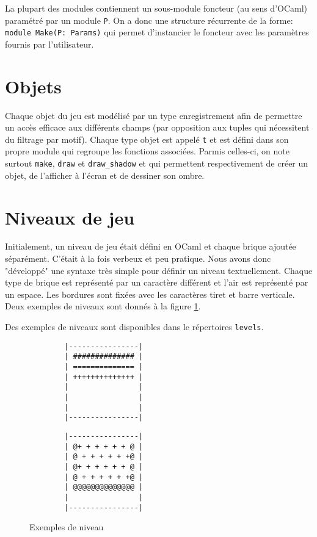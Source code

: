 \documentclass[french]{template}
\begin{document}
La plupart des modules contiennent un sous-module foncteur (au sens d'OCaml) paramétré par un module \texttt{P}. On a donc une structure récurrente de la forme: \texttt{module Make(P: Params)} qui permet d'instancier le foncteur avec les paramètres fournis par l'utilisateur.

\section{Objets}

Chaque objet du jeu est modélisé par un type enregistrement afin de permettre un accès efficace aux différents champs (par opposition aux tuples qui nécessitent du filtrage par motif). Chaque type objet est appelé \texttt{t} et est défini dans son propre module qui regroupe les fonctions associées. Parmis celles-ci, on note surtout \texttt{make}, \texttt{draw} et \texttt{draw\_shadow} et qui permettent respectivement de créer un objet, de l'afficher à l'écran et de dessiner son ombre.

\section{Niveaux de jeu}

Initialement, un niveau de jeu était défini en OCaml et chaque brique ajoutée séparément. C'était à la fois verbeux et peu pratique. Nous avons donc "développé" une syntaxe très simple pour définir un niveau textuellement. Chaque type de brique est représenté par un caractère différent et l'air est représenté par un espace. Les bordures sont fixées avec les caractères tiret et barre verticale. Deux exemples de niveaux sont donnés à la figure \ref{fig:level.txt}.

Des exemples de niveaux sont disponibles dans le répertoires \texttt{levels}.

\begin{figure}[ht]
    \begin{minipage}{0.4\textwidth}
        \begin{verbatim}
        |----------------|
        | ############## |
        | ============== |
        | ++++++++++++++ |
        |                |
        |                |
        |                |
        |----------------|
        \end{verbatim}
    \end{minipage}
    \hfill
    \begin{minipage}{0.4\textwidth}
        \begin{verbatim}
        |----------------|
        | @+ + + + + + @ |
        | @ + + + + + +@ |
        | @+ + + + + + @ |
        | @ + + + + + +@ |
        | @@@@@@@@@@@@@@ |
        |                |
        |----------------|
        \end{verbatim}
    \end{minipage}
    \caption{Exemples de niveau}
    \label{fig:level.txt}
\end{figure}
\end{document}

